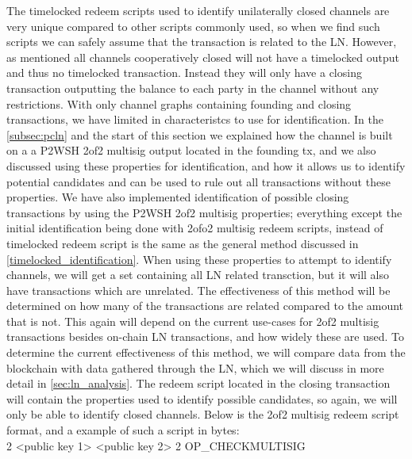 The timelocked redeem scripts used to identify unilaterally closed channels are very unique compared to other scripts commonly used, so when we find such scripts we can safely assume that the transaction is related to the LN. However, as mentioned all channels cooperatively closed will not have a timelocked output and thus no timelocked transaction. Instead they will only have a closing transaction outputting the balance to each party in the channel without any restrictions. With only channel graphs containing founding and closing transactions, we have limited in characteristcs to use for identification. In the \cref{subsec:pcln} and the start of this section we explained how the channel is built on a a P2WSH 2of2 multisig output located in the founding tx, and we also discussed using these properties for identification, and how it allows us to identify potential candidates and can be used to rule out all transactions without these properties.
We have also implemented identification of possible closing transactions by using the P2WSH 2of2 multisig properties; everything except the initial identification being done with 2ofo2 multisig redeem scripts, instead of timelocked redeem script is the same as the general method discussed in \cref{timelocked_identification}.
 When using these properties to attempt to identify channels, we will get a set containing all LN related transction, but it will also have transactions which are unrelated. The effectiveness of this method will be determined on how many of the transactions are related compared to the amount that is not. This again will depend on the current use-cases for 2of2 multisig transactions besides on-chain LN transactions, and how widely these are used. To determine the current effectiveness of this method, we will compare data from the blockchain with data gathered through the LN, which we will discuss in more detail in \cref{sec:ln_analysis}. 
 The redeem script located in the closing transaction will contain the properties used to identify possible candidates, so again, we will only be able to identify closed channels.
Below is the 2of2 multisig redeem script format, and a example of such a script in bytes:
\\

2 <public key 1> <public key 2> 2 OP\_CHECKMULTISIG
\\

\noindent [82 33 2 211 153 245 240 225 125 95 140 116 20 99 81 38 139 135 136 59 14 125 34 181 148 47 67 16 42 24 147 28 144 61 33 33 2 215 1 70 141 233 112 91 253 252 202 27 73 158 254 234 159 125 98 30 78 159 235 6 46 167 103 105 239 180 125 168 66 82 174]
\\

